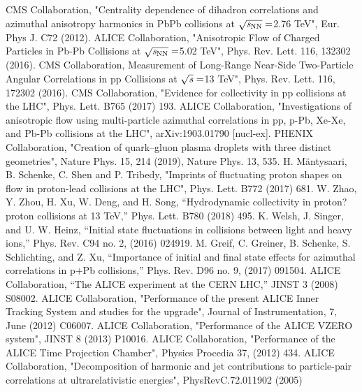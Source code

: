 %
CMS Collaboration, "Centrality dependence of dihadron correlations and azimuthal anisotropy harmonics in PbPb collisions at  $\sqrt{\it{s_{\rm{NN}}}} = $2.76 TeV",   Eur. Phys J. C72 (2012).
ALICE Collaboration, "Anisotropic Flow of Charged Particles in Pb-Pb Collisions at $\sqrt{\it{s_{\rm{NN}}}} = $5.02 TeV",  Phys. Rev. Lett. 116, 132302 (2016).
CMS Collaboration, Measurement of Long-Range Near-Side Two-Particle Angular Correlations in pp Collisions at $\sqrt{\it{s}} = $13 TeV", Phys. Rev. Lett. 116, 172302 (2016).
CMS Collaboration, "Evidence for collectivity in pp collisions at the LHC", Phys. Lett. B765 (2017) 193.
ALICE Collaboration, "Investigations of anisotropic flow using multi-particle azimuthal correlations in pp, p-Pb, Xe-Xe, and Pb-Pb collisions at the LHC", arXiv:1903.01790 [nucl-ex].
PHENIX Collaboration, "Creation of quark–gluon plasma droplets with three distinct geometries", Nature Phys. 15, 214 (2019), Nature Phys. 13, 535.
H. Mäntysaari, B. Schenke, C. Shen and P. Tribedy, "Imprints of fluctuating proton shapes on flow in proton-lead collisions at the LHC", Phys. Lett. B772 (2017) 681.
W. Zhao, Y. Zhou, H. Xu, W. Deng, and H. Song, “Hydrodynamic collectivity in proton?proton collisions at 13 TeV,” Phys. Lett. B780 (2018) 495.
K. Welsh, J. Singer, and U. W. Heinz, “Initial state fluctuations in collisions between light and heavy ions,” Phys. Rev. C94 no. 2, (2016) 024919.
M. Greif, C. Greiner, B. Schenke, S. Schlichting, and Z. Xu, “Importance of initial and final state effects for azimuthal correlations in p+Pb collisions,” Phys. Rev. D96 no. 9, (2017) 091504.
ALICE Collaboration, “The ALICE experiment at the CERN LHC,” JINST 3 (2008) S08002.
ALICE Collaboration, "Performance of the present ALICE Inner Tracking System and studies for the upgrade",  Journal of Instrumentation, 7, June (2012) C06007.
ALICE Collaboration, "Performance of the ALICE VZERO system", JINST 8 (2013) P10016.
ALICE Collaboration, "Performance of the ALICE Time Projection Chamber", Physics Procedia 37, (2012) 434.
ALICE Collaboration, "Decomposition of harmonic and jet contributions to particle-pair correlations at ultrarelativistic energies", PhysRevC.72.011902 (2005)



